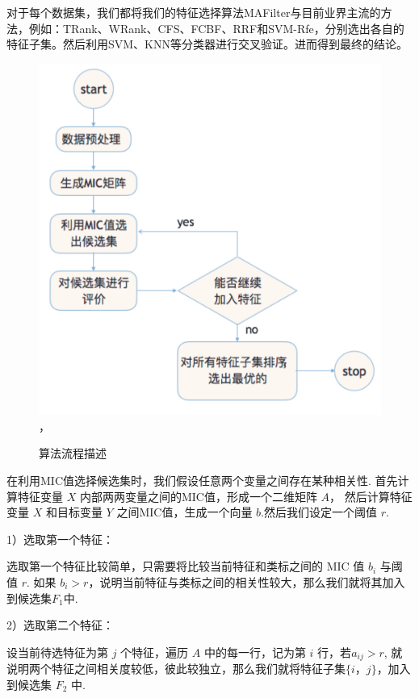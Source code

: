 \documentclass{njubachelor}
\begin{document}
对于每个数据集，我们都将我们的特征选择算法MAFilter与目前业界主流的方法，例如：TRank、WRank、CFS、FCBF、RRF和SVM-Rfe，分别选出各自的特征子集。然后利用SVM、KNN等分类器进行交叉验证。进而得到最终的结论。

\begin{figure}[!ht]
    \centering
    \includegraphics[width=5.5in]{pic/fig5}， 
    \caption{算法流程描述}
\end{figure}

在利用MIC值选择候选集时，我们假设任意两个变量之间存在某种相关性. 首先计算特征变量 $X$ 内部两两变量之间的MIC值，形成一个二维矩阵 $A$， 然后计算特征变量 $X$ 和目标变量 $Y$ 之间MIC值，生成一个向量 $b$.然后我们设定一个阈值 $r$.

1）选取第一个特征：

选取第一个特征比较简单，只需要将比较当前特征和类标之间的 MIC 值 $b_i$ 与阈值 $r$. 如果 $b_i > r$，说明当前特征与类标之间的相关性较大，那么我们就将其加入到候选集$F_1$中.

2）选取第二个特征：

设当前待选特征为第 $j$ 个特征，遍历 $A$ 中的每一行，记为第 $i$ 行，若$a_{ij} > r$, 就说明两个特征之间相关度较低，彼此较独立，那么我们就将特征子集$\{i，j\}$，加入到候选集 $F_2$ 中.
\end{document}
